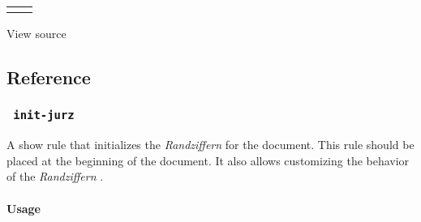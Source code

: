 \begin{longtable}[]{@{}ll@{}}
\toprule\noalign{}
\endhead
\bottomrule\noalign{}
\endlastfoot
\pandocbounded{}
&
\pandocbounded{} \\
\end{longtable}

View source

\begin{Shaded}
\begin{Highlighting}[]
\NormalTok{)}








\end{Highlighting}
\end{Shaded}

\subsection{Reference}\label{reference}

\subsubsection{\texorpdfstring{\texttt{\ init-jurz\ }}{ init-jurz }}\label{init-jurz}

A show rule that initializes the \emph{Randziffern} for the document.
This rule should be placed at the beginning of the document. It also
allows customizing the behavior of the \emph{Randziffern} .

\paragraph{Usage}\label{usage}

\begin{Shaded}
\begin{Highlighting}[]
\NormalTok{)}
\end{Highlighting}
\end{Shaded}

